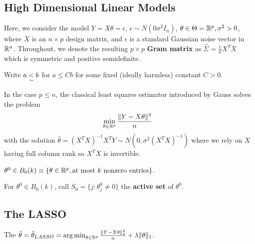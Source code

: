 \subsection{High Dimensional Linear Models}
\label{sec:high-dimens-line}

Here, we consider the model $Y = X \theta = \epsilon$, $\epsilon \sim
N(0 \sigma^{2} I_{n})$, $\theta \in \Theta = \mathbb{R}^{p}, \sigma^{2} > 0$,
where $X$ is an $n \times p$ design matrix, and $\epsilon$ is a
standard Gaussian noise vector in $\mathbb{R}^{n}$.  Throughout, we denote the
resulting $p \times p$ \textbf{Gram matrix} as $\hat \Sigma =
\frac{1}{n} X^{T} X$ which is symmetric and positive semidefinite.

Write $a \underset{\sim}{<} b$ for $a \leq C b$ for some fixed (ideally
harmless) constant $C > 0$.

\begin{thm}
  In the case $p \leq n$, the classical least squares estimator
  introduced by Gauss solves the problem
  \begin{equation}
    \label{eq:30} \min_{\theta \in \mathbb{R}^{p}} \frac{\| Y - X \theta
      \|^{2}}{n}
  \end{equation}
  with the solution $\hat \theta = (X^{T}X)^{-1} X^{T}Y \sim N(0,
  \sigma^{2}(X^{T} X)^{-1})$ where we rely on $X$ having full column
  rank so $X^{T} X$ is invertible.
\end{thm}

\begin{defn}
  \label{sec:case-p-leq}
  $\theta^{0} \in B_{0}(k) \equiv \{ \theta \in \mathbb{R}^{p}, \text{at most
    $k$ nonzero entries} \} $.

  For $\theta^{0} \in B_{0}(k)$, call $S_{0} = \{ j : \theta_{j}^{0}
  \neq 0 \} $ the \textbf{active set} of $\theta^{0}$.
\end{defn}

\subsection{The LASSO}
\label{sec:lasso}

\begin{defn}
  \label{sec:case-p-leq-1}
  The $\tilde \theta = \tilde \theta_{LASSO} = \operatorname*{arg\,min}_{\theta \in
    \mathbb{R}^{p}} \frac{\| Y - X \theta \|_{2}^{2}}{n}  + \lambda \| \theta \|_{1}$.
\end{defn}

